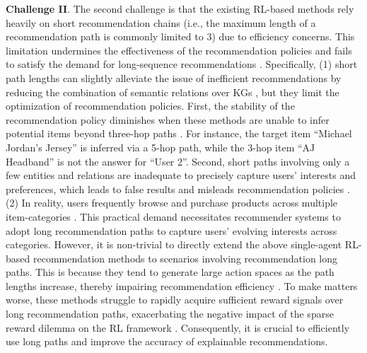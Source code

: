 \documentclass[conference]{IEEEtran}
\begin{document}
\textbf{Challenge II}.
The second challenge is that the existing RL-based  methods rely heavily on short recommendation chains (i.e., the maximum length of a recommendation path is commonly limited to 3) due to efficiency concerns. This limitation undermines the effectiveness of the recommendation policies and fails to satisfy the demand for long-sequence recommendations \cite{path1}. Specifically, (1) short path lengths can slightly alleviate the issue of inefficient recommendations by reducing the combination of semantic relations over KGs \cite{PGPR}, but they limit the optimization of recommendation policies. First, the stability of the recommendation policy diminishes when these methods are unable to infer potential items beyond three-hop paths \cite{MMKGR}. For instance, the target item ``Michael Jordan's Jersey'' is inferred via a 5-hop path, while the 3-hop item ``AJ Headband'' is not the answer for ``User 2''.  Second, short paths involving only a few entities and relations are inadequate to precisely capture users' interests and preferences, which leads to false results \cite{multihopKGR} and misleads recommendation policies \cite{KGAT}. (2) In reality, users frequently browse and purchase products across multiple item-categories \cite{CoCoRec}. This practical demand necessitates recommender systems to adopt long recommendation paths to   capture users' evolving interests across categories. However, it is non-trivial to directly extend the above single-agent RL-based recommendation methods \cite{PGPR} \cite{ADAC} \cite{UCPR}  \cite{INFER} \cite{SAPL} \cite{ReMR} \cite{CogER} to  scenarios involving recommendation long paths. This is because they tend to generate large action spaces as the path lengths increase, thereby impairing recommendation efficiency \cite{multiagentadvan}. To make matters worse, these methods struggle to rapidly acquire sufficient reward signals over long recommendation paths, exacerbating the negative impact of the sparse reward dilemma on the RL framework \cite{RLsurvey1}. Consequently, it is crucial to efficiently use long paths and improve the accuracy of explainable recommendations.


\end{document}
